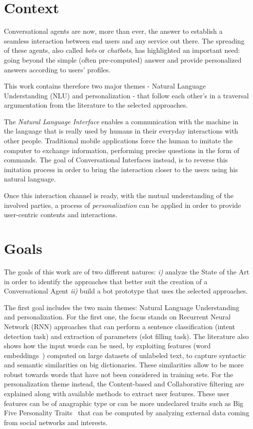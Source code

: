 
\section*{Context}
Conversational agents are now, more than ever, the answer to establish a seamless interaction between end users and any service out there. The spreading of these agents, also called \textit{bots} or \textit{chatbots}, has highlighted an important need: going beyond the simple (often pre-computed) answer and provide personalized answers according to users' profiles.

This work contains therefore two major themes - Natural Language Understanding (NLU) and personalization - that follow each other's in a traversal argumentation from the literature to the selected approaches.

The \textit{Natural Language Interface} enables a communication with the machine in the language that is really used by humans in their everyday interactions with other people. Traditional mobile applications force the human to imitate the computer to exchange information, performing precise questions in the form of commands. The goal of Conversational Interfaces instead, is to reverse this imitation process in order to bring the interaction closer to the users using his natural language.

Once this interaction channel is ready, with the mutual understanding of the involved parties, a process of \textit{personalization} can be applied in order to provide user-centric contents and interactions.

\section*{Goals}
The goals of this work are of two different natures: \textit{i)} analyze the State of the Art in order to identify the approaches that better suit the creation of a Conversational Agent \textit{ii)} build a bot prototype that uses the selected approaches.

The first goal includes the two main themes: Natural Language Understanding and personalization. For the first one, the focus stands on Recurrent Neural Network (RNN) approaches that can perform a sentence classification (intent detection task) and extraction of parameters (slot filling task). The literature also shows how the input words can be used, by exploiting features (word embeddings~\cite{pennington2014glove}) computed on large datasets of unlabeled text, to capture syntactic and semantic similarities on big dictionaries. These similarities allow to be more robust towards words that have not been considered in training sets. For the personalization theme instead, the Content-based and Collaborative filtering are explained along with available methods to extract user features. These user features can be of anagraphic type or can be more undeclared traits such as Big Five Personality Traits~\cite{goldberg1993structure} that can be computed by analyzing external data coming from social networks and interests.

